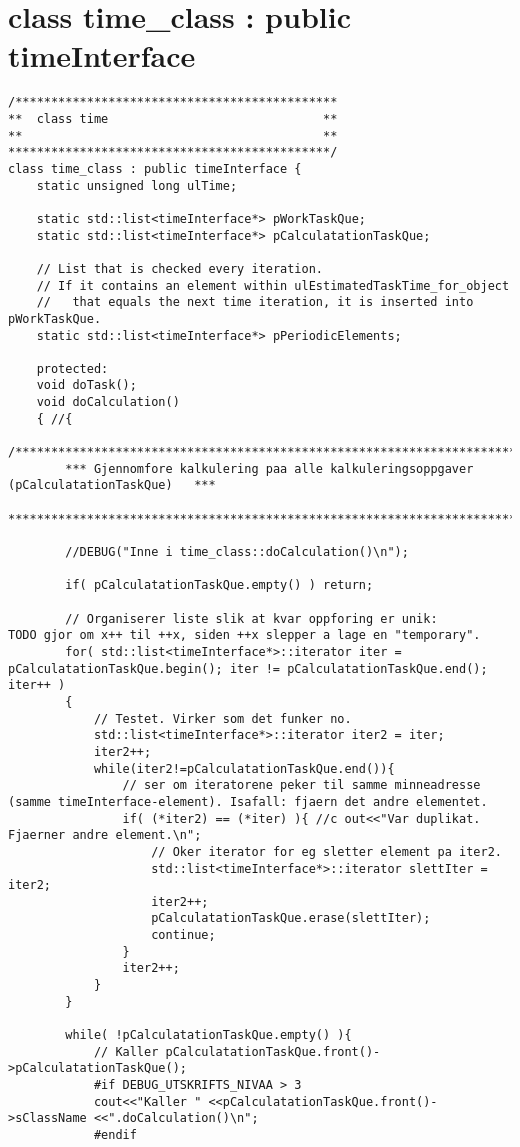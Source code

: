 \chapter{class time\_class : public timeInterface} %
\label{appendixTimeClass}
\begin{lstlisting}
/*********************************************
** 	class time  							**
** 		 									**
*********************************************/
class time_class : public timeInterface {
	static unsigned long ulTime;
	
	static std::list<timeInterface*> pWorkTaskQue;
	static std::list<timeInterface*> pCalculatationTaskQue;

	// List that is checked every iteration.
	// If it contains an element within ulEstimatedTaskTime_for_object
	//   that equals the next time iteration, it is inserted into pWorkTaskQue.
	static std::list<timeInterface*> pPeriodicElements;

	protected:
	void doTask();
	void doCalculation()
	{ //{
		/**************************************************************************************
		*** Gjennomfore kalkulering paa alle kalkuleringsoppgaver (pCalculatationTaskQue) 	***
		**************************************************************************************/

		//DEBUG("Inne i time_class::doCalculation()\n");

		if( pCalculatationTaskQue.empty() ) return;

		// Organiserer liste slik at kvar oppforing er unik: 			TODO gjor om x++ til ++x, siden ++x slepper a lage en "temporary".
		for( std::list<timeInterface*>::iterator iter = pCalculatationTaskQue.begin(); iter != pCalculatationTaskQue.end(); iter++ )
		{
			// Testet. Virker som det funker no.
			std::list<timeInterface*>::iterator iter2 = iter; 
			iter2++;
			while(iter2!=pCalculatationTaskQue.end()){
				// ser om iteratorene peker til samme minneadresse (samme timeInterface-element). Isafall: fjaern det andre elementet.
			 	if( (*iter2) == (*iter) ){ //c out<<"Var duplikat. Fjaerner andre element.\n";
					// Oker iterator for eg sletter element pa iter2.
					std::list<timeInterface*>::iterator slettIter = iter2;
					iter2++;
					pCalculatationTaskQue.erase(slettIter);
					continue;
				}
				iter2++;
			}
		}
	
		while( !pCalculatationTaskQue.empty() ){
			// Kaller pCalculatationTaskQue.front()->pCalculatationTaskQue();
			#if DEBUG_UTSKRIFTS_NIVAA > 3
			cout<<"Kaller " <<pCalculatationTaskQue.front()->sClassName <<".doCalculation()\n";
			#endif


\end{lstlisting}
